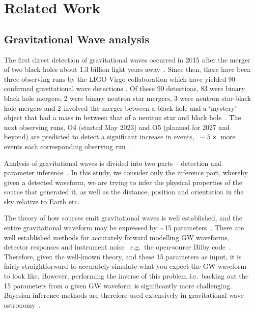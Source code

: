 \section{Related Work}\label{sec:related_work}

\subsection{Gravitational Wave analysis}

The first direct detection of gravitational waves occurred in 2015 after the merger of two black holes about 1.3 billion light years away~\cite{LIGO_2016}. Since then, there have been three observing runs by the LIGO-Virgo collaboration which have yielded 90 confirmed gravitational wave detections . Of these 90 detections, 83 were binary black hole mergers, 2 were binary neutron star mergers, 3 were neutron star-black hole mergers and 2 involved the merger between a black hole and a `mystery' object that had a mass in between that of a neutron star and black hole~\cite{LIGO_FAQ_Website}. The next observing runs, O4 (started May 2023) and O5 (planned for 2027 and beyond) are predicted to detect a significant increase in events, $~\sim5\times$ more events each corresponding observing run~\cite{Petrov_2022}.

Analysis of gravitational waves is divided into two parts -- detection and parameter inference~\cite{bhardwaj2023peregrine}. In this study, we consider only the inference part, whereby given a detected waveform, we are trying to infer the physical properties of the source that generated it, as well as the distance, position and orientation in the sky relative to Earth etc.

The theory of how sources emit gravitational waves is well established, and the entire gravitational waveform may be expressed by $\sim$15 parameters~\cite{Thrane_Talbot_2019}. 
There are well established methods for accurately forward modelling GW waveforms, detector responses and instrument noise~\cite{alvey2023things} e.g.~the open-source Bilby code~\cite{Ashton_Bilby_2019,Romero_Bilby_2020,Ashton_Talbot_Bilby_2021}. Therefore, given the well-known theory, and these 15 parameters as input, it is fairly straightforward to accurately simulate what you expect the GW waveform to look like. However, performing the inverse of this problem i.e.~backing out the 15 parameters from a given GW waveform is significantly more challenging. Bayesian inference methods are therefore used extensively in gravitational-wave astronomy~\cite{Thrane_Talbot_2019}.

